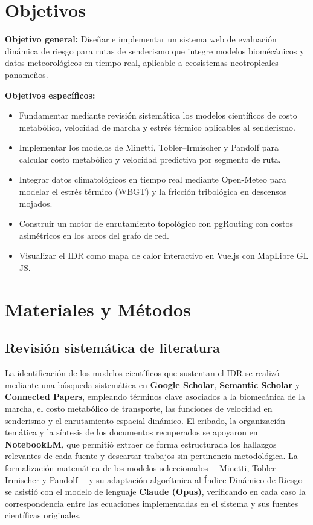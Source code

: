 \documentclass[10pt,letterpaper,twocolumn]{article}
\begin{document}
\section{Objetivos}

\textbf{Objetivo general:} Dise\~{n}ar e implementar un sistema web de
evaluaci\'{o}n din\'{a}mica de riesgo para rutas de senderismo que integre
modelos biom\'{e}c\'{a}nicos y datos meteorol\'{o}gicos en tiempo real,
aplicable a ecosistemas neotropicales paname\~{n}os.

\textbf{Objetivos espec\'{i}ficos:}
\begin{itemize}
  \setlength\itemsep{0pt}
  \item Fundamentar mediante revisi\'{o}n sistem\'{a}tica los modelos
        cient\'{i}ficos de costo metab\'{o}lico, velocidad de marcha y
        estr\'{e}s t\'{e}rmico aplicables al senderismo.
  \item Implementar los modelos de Minetti, Tobler--Irmischer y Pandolf
        para calcular costo metab\'{o}lico y velocidad predictiva por
        segmento de ruta.
  \item Integrar datos climatol\'{o}gicos en tiempo real mediante
        Open-Meteo para modelar el estr\'{e}s t\'{e}rmico (WBGT) y la
        fricci\'{o}n tribol\'{o}gica en descensos mojados.
  \item Construir un motor de enrutamiento topol\'{o}gico con pgRouting
        con costos asim\'{e}tricos en los arcos del grafo de red.
  \item Visualizar el IDR como mapa de calor interactivo en Vue.js con
        MapLibre GL JS.
\end{itemize}

\section{Materiales y M\'{e}todos}

\subsection{Revisi\'{o}n sistem\'{a}tica de literatura}

La identificaci\'{o}n de los modelos cient\'{i}ficos que sustentan el IDR
se realiz\'{o} mediante una b\'{u}squeda sistem\'{a}tica en \textbf{Google
Scholar}, \textbf{Semantic Scholar} y \textbf{Connected Papers}, empleando
t\'{e}rminos clave asociados a la biomec\'{a}nica de la marcha, el costo
metab\'{o}lico de transporte, las funciones de velocidad en senderismo y el
enrutamiento espacial din\'{a}mico. El cribado, la organizaci\'{o}n
tem\'{a}tica y la s\'{i}ntesis de los documentos recuperados se apoyaron en
\textbf{NotebookLM}, que permiti\'{o} extraer de forma estructurada los
hallazgos relevantes de cada fuente y descartar trabajos sin pertinencia
metodol\'{o}gica. La formalizaci\'{o}n matem\'{a}tica de los modelos
seleccionados ---Minetti, Tobler--Irmischer y Pandolf--- y su adaptaci\'{o}n
algor\'{i}tmica al \'{I}ndice Din\'{a}mico de Riesgo se asisti\'{o} con el
modelo de lenguaje \textbf{Claude (Opus)}, verificando en cada caso la
correspondencia entre las ecuaciones implementadas en el sistema y sus
fuentes cient\'{i}ficas originales.
\end{document}

